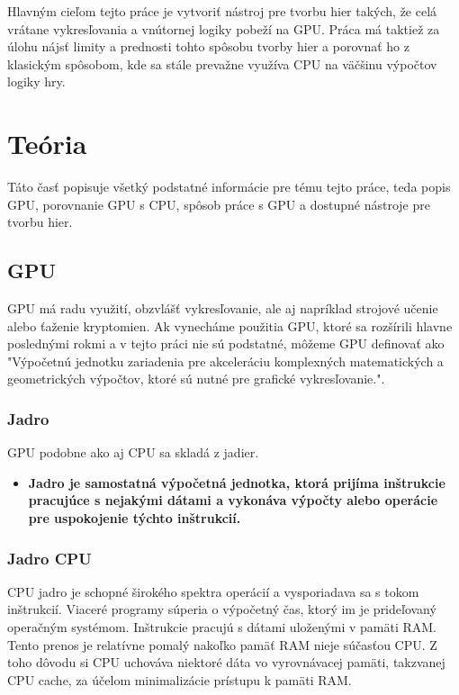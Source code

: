 Hlavným cieľom tejto práce je vytvoriť nástroj pre tvorbu hier takých, že celá vrátane vykresľovania a vnútornej logiky pobeží na GPU. Práca má taktiež za úlohu nájsť limity a prednosti tohto spôsobu tvorby hier a porovnať ho z klasickým spôsobom, kde sa stále prevažne využíva CPU na väčšinu výpočtov logiky hry.

\chapter{Teória}

Táto časť popisuje všetký podstatné informácie pre tému tejto práce, teda popis GPU, porovnanie GPU s CPU, spôsob práce s GPU a dostupné nástroje pre tvorbu hier.

\section{GPU}

GPU má radu využití, obzvlášť vykresľovanie, ale aj napríklad strojové učenie alebo ťaženie kryptomien. Ak vynecháme použitia GPU, ktoré sa rozšírili hlavne poslednými rokmi a v tejto práci nie sú podstatné, môžeme GPU definovať ako "Výpočetnú jednotku zariadenia pre akceleráciu komplexných matematických a geometrických výpočtov, ktoré sú nutné pre grafické vykresľovanie.". 

\subsection{Jadro}
GPU podobne ako aj CPU sa skladá z jadier. 

\begin{itemize}
  \item{\bf Jadro \rm je samostatná výpočetná jednotka, ktorá prijíma inštrukcie pracujúce s nejakými dátami a vykonáva výpočty alebo operácie pre uspokojenie týchto inštrukcií.}
\end{itemize}

\subsection*{Jadro CPU}
CPU jadro je schopné širokého spektra operácií a vysporiadava sa s tokom inštrukcií. Viaceré programy súperia o výpočetný čas, ktorý im je prideľovaný operačným systémom. Inštrukcie pracujú s dátami uloženými v pamäti RAM. Tento prenos je relatívne pomalý nakoľko pamäť RAM nieje súčasťou CPU. Z toho dôvodu si CPU uchováva niektoré dáta vo vyrovnávacej pamäti, takzvanej CPU cache, za účelom minimalizácie prístupu k pamäti RAM.

